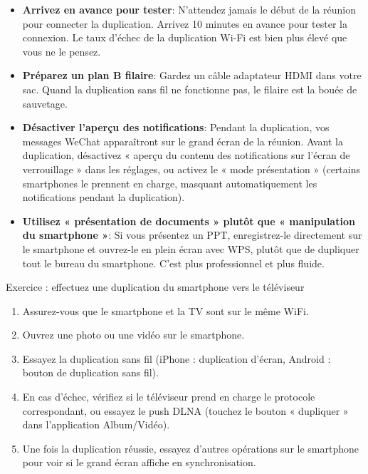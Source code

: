 \begin{itemize}
  \item \textbf{Arrivez en avance pour tester}: N'attendez jamais le début de la réunion pour connecter la duplication. Arrivez 10 minutes en avance pour tester la connexion. Le taux d'échec de la duplication Wi-Fi est bien plus élevé que vous ne le pensez.
  \item \textbf{Préparez un plan B filaire}: Gardez un câble adaptateur HDMI dans votre sac. Quand la duplication sans fil ne fonctionne pas, le filaire est la bouée de sauvetage.
  \item \textbf{Désactiver l'aperçu des notifications}: Pendant la duplication, vos messages WeChat apparaîtront sur le grand écran de la réunion. Avant la duplication, désactivez « aperçu du contenu des notifications sur l'écran de verrouillage » dans les réglages, ou activez le « mode présentation » (certains smartphones le prennent en charge, masquant automatiquement les notifications pendant la duplication).
  \item \textbf{Utilisez « présentation de documents » plutôt que « manipulation du smartphone »}: Si vous présentez un PPT, enregistrez-le directement sur le smartphone et ouvrez-le en plein écran avec WPS, plutôt que de dupliquer tout le bureau du smartphone. C'est plus professionnel et plus fluide.
\end{itemize}

\begin{tcbpractice}{Exercice : effectuez une duplication du smartphone vers le téléviseur}
\begin{enumerate}
  \item Assurez-vous que le smartphone et la TV sont sur le même WiFi.
  \item Ouvrez une photo ou une vidéo sur le smartphone.
  \item Essayez la duplication sans fil (iPhone : duplication d'écran, Android : bouton de duplication sans fil).
  \item En cas d'échec, vérifiez si le téléviseur prend en charge le protocole correspondant, ou essayez le push DLNA (touchez le bouton « dupliquer » dans l'application Album/Vidéo).
  \item Une fois la duplication réussie, essayez d'autres opérations sur le smartphone pour voir si le grand écran affiche en synchronisation.
\end{enumerate}

\end{tcbpractice}

